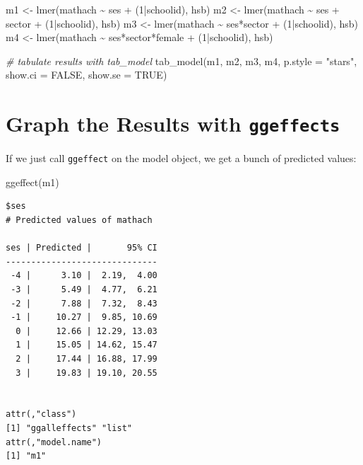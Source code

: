 \documentclass[
  letterpaper,
  DIV=11,
  numbers=noendperiod]{scrreprt}
\newenvironment{Shaded}{}{}
\newcommand{\AttributeTok}[1]{\textcolor[rgb]{0.49,0.56,0.16}{#1}}
\newcommand{\CommentTok}[1]{\textcolor[rgb]{0.38,0.63,0.69}{\textit{#1}}}
\newcommand{\ConstantTok}[1]{\textcolor[rgb]{0.53,0.00,0.00}{#1}}
\newcommand{\DecValTok}[1]{\textcolor[rgb]{0.25,0.63,0.44}{#1}}
\newcommand{\FunctionTok}[1]{\textcolor[rgb]{0.02,0.16,0.49}{#1}}
\newcommand{\NormalTok}[1]{#1}
\newcommand{\OtherTok}[1]{\textcolor[rgb]{0.00,0.44,0.13}{#1}}
\newcommand{\SpecialCharTok}[1]{\textcolor[rgb]{0.25,0.44,0.63}{#1}}
\newcommand{\StringTok}[1]{\textcolor[rgb]{0.25,0.44,0.63}{#1}}
\begin{document}
\begin{Shaded}
\begin{Highlighting}[]
\NormalTok{m1 }\OtherTok{\textless{}{-}} \FunctionTok{lmer}\NormalTok{(mathach }\SpecialCharTok{\textasciitilde{}}\NormalTok{ ses }\SpecialCharTok{+}\NormalTok{ (}\DecValTok{1}\SpecialCharTok{|}\NormalTok{schoolid), hsb)}
\NormalTok{m2 }\OtherTok{\textless{}{-}} \FunctionTok{lmer}\NormalTok{(mathach }\SpecialCharTok{\textasciitilde{}}\NormalTok{ ses }\SpecialCharTok{+}\NormalTok{ sector }\SpecialCharTok{+}\NormalTok{ (}\DecValTok{1}\SpecialCharTok{|}\NormalTok{schoolid), hsb)}
\NormalTok{m3 }\OtherTok{\textless{}{-}} \FunctionTok{lmer}\NormalTok{(mathach }\SpecialCharTok{\textasciitilde{}}\NormalTok{ ses}\SpecialCharTok{*}\NormalTok{sector }\SpecialCharTok{+}\NormalTok{ (}\DecValTok{1}\SpecialCharTok{|}\NormalTok{schoolid), hsb)}
\NormalTok{m4 }\OtherTok{\textless{}{-}} \FunctionTok{lmer}\NormalTok{(mathach }\SpecialCharTok{\textasciitilde{}}\NormalTok{ ses}\SpecialCharTok{*}\NormalTok{sector}\SpecialCharTok{*}\NormalTok{female }\SpecialCharTok{+}\NormalTok{ (}\DecValTok{1}\SpecialCharTok{|}\NormalTok{schoolid), hsb)}

\CommentTok{\# tabulate results with tab\_model}
\FunctionTok{tab\_model}\NormalTok{(m1, m2, m3, m4,}
          \AttributeTok{p.style =} \StringTok{"stars"}\NormalTok{,}
          \AttributeTok{show.ci =} \ConstantTok{FALSE}\NormalTok{,}
          \AttributeTok{show.se =} \ConstantTok{TRUE}\NormalTok{)}
\end{Highlighting}
\end{Shaded}

\section{\texorpdfstring{Graph the Results with
\texttt{ggeffects}}{Graph the Results with ggeffects}}\label{graph-the-results-with-ggeffects}

If we just call \texttt{ggeffect} on the model object, we get a bunch of
predicted values:

\begin{Shaded}
\begin{Highlighting}[]
\FunctionTok{ggeffect}\NormalTok{(m1)}
\end{Highlighting}
\end{Shaded}

\begin{verbatim}
$ses
# Predicted values of mathach

ses | Predicted |       95% CI
------------------------------
 -4 |      3.10 |  2.19,  4.00
 -3 |      5.49 |  4.77,  6.21
 -2 |      7.88 |  7.32,  8.43
 -1 |     10.27 |  9.85, 10.69
  0 |     12.66 | 12.29, 13.03
  1 |     15.05 | 14.62, 15.47
  2 |     17.44 | 16.88, 17.99
  3 |     19.83 | 19.10, 20.55


attr(,"class")
[1] "ggalleffects" "list"        
attr(,"model.name")
[1] "m1"
\end{verbatim}
\end{document}

